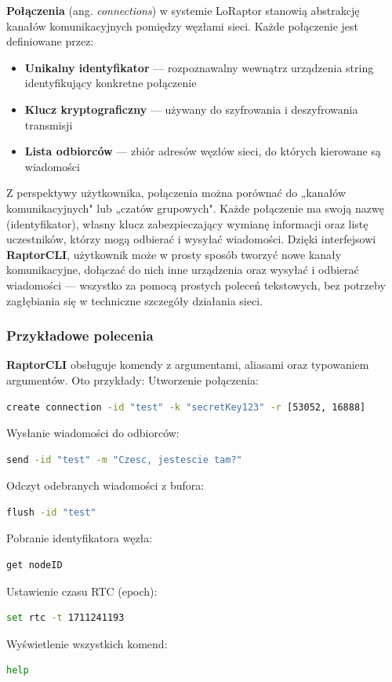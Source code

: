 \textbf{Połączenia} (ang. \textit{connections}) w systemie LoRaptor stanowią abstrakcję kanałów komunikacyjnych pomiędzy węzłami sieci. Każde połączenie jest definiowane przez:

\begin{itemize}
	\item \textbf{Unikalny identyfikator} --- rozpoznawalny wewnątrz urządzenia string identyfikujący konkretne połączenie
	\item \textbf{Klucz kryptograficzny} --- używany do szyfrowania i deszyfrowania transmisji
	\item \textbf{Lista odbiorców} --- zbiór adresów węzłów sieci, do których kierowane są wiadomości
\end{itemize}

Z perspektywy użytkownika, połączenia można porównać do „kanałów komunikacyjnych" lub „czatów grupowych". Każde połączenie ma swoją nazwę (identyfikator), własny klucz zabezpieczający wymianę informacji oraz listę uczestników, którzy mogą odbierać i wysyłać wiadomości. Dzięki interfejsowi \textbf{RaptorCLI}, użytkownik może w prosty sposób tworzyć nowe kanały komunikacyjne, dołączać do nich inne urządzenia oraz wysyłać i odbierać wiadomości --- wszystko za pomocą prostych poleceń tekstowych, bez potrzeby zagłębiania się w techniczne szczegóły działania sieci.

\clearpage
\subsubsection{Przykładowe polecenia}

\textbf{RaptorCLI} obsługuje komendy z argumentami, aliasami oraz typowaniem argumentów. Oto przykłady:
\vspace{0.3cm}
Utworzenie połączenia:
\begin{lstlisting}[language=bash]
create connection -id "test" -k "secretKey123" -r [53052, 16888]
\end{lstlisting}
\vspace{0.3cm}
Wysłanie wiadomości do odbiorców:
\begin{lstlisting}[language=bash]
send -id "test" -m "Czesc, jestescie tam?"
\end{lstlisting}
\vspace{0.3cm}
Odczyt odebranych wiadomości z bufora:
\begin{lstlisting}[language=bash]
flush -id "test"
\end{lstlisting}
\vspace{0.3cm}
Pobranie identyfikatora węzła:
\begin{lstlisting}[language=bash]
get nodeID
\end{lstlisting}
\vspace{0.3cm}
Ustawienie czasu RTC (epoch):
\begin{lstlisting}[language=bash]
set rtc -t 1711241193
\end{lstlisting}
\vspace{0.3cm}
Wyświetlenie wszystkich komend:
\begin{lstlisting}[language=bash]
help
\end{lstlisting}

